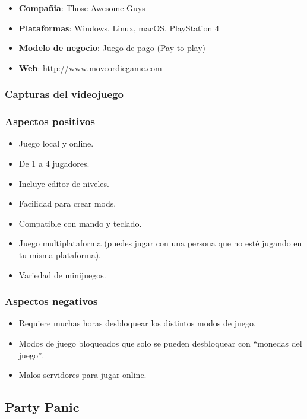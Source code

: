 \documentclass[12pt, spanish]{article}
\begin{document}
\begin{itemize}
	\item \textbf{Compañia}: Those Awesome Guys
	\item \textbf{Plataformas}: Windows, Linux, macOS, PlayStation 4
	\item \textbf{Modelo de negocio}: Juego de pago (Pay-to-play)
	\item \textbf{Web}: \url{http://www.moveordiegame.com}
\end{itemize}

\subsubsection{Capturas del videojuego}

\subsubsection{Aspectos positivos}

\begin{itemize}
	\item Juego local y online.
	\item De 1 a 4 jugadores.
	\item Incluye editor de niveles.
	\item Facilidad para crear mods.
	\item Compatible con mando y teclado.
	\item Juego multiplataforma (puedes jugar con una persona que no esté jugando en tu misma plataforma).
	\item Variedad de minijuegos.
\end{itemize}

\subsubsection{Aspectos negativos}

\begin{itemize}
	\item Requiere muchas horas desbloquear los distintos modos de juego.
	\item Modos de juego bloqueados que solo se pueden desbloquear con “monedas del juego”.
	\item Malos servidores para jugar online.
\end{itemize}

\subsection{Party Panic}
\end{document}
